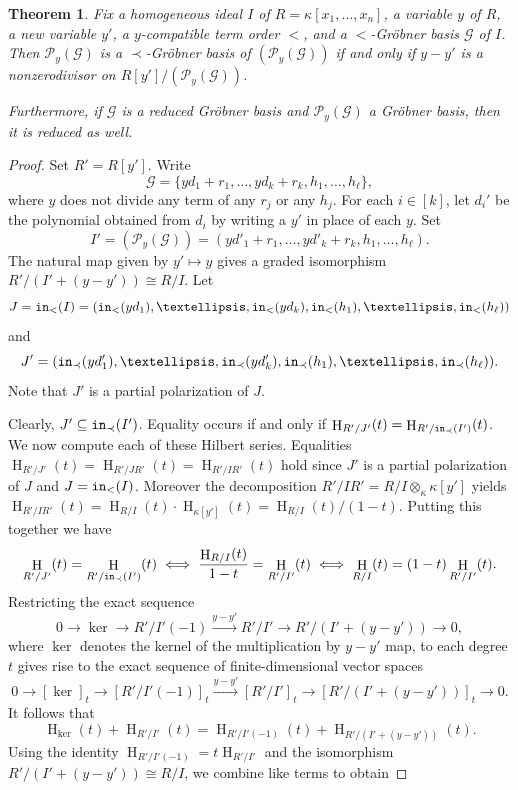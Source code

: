 \documentclass[12pt, reqno]{amsart}
\numberwithin{equation}{section}
\newtheorem{theorem}{Theorem}[section]
\newtheorem{Main Conjecture}[theorem]{Main Conjecture}
\theoremstyle{definition}
\theoremstyle{plain}
\newcommand{\init}{{\tt in}}
\newcommand{\G}{\mathcal{G}}
\renewcommand{\P}{\mathcal{P}}
\DeclareMathOperator{\HS}{H}
\begin{document}
\begin{theorem}\label{thm:inducedGB}
    Fix a homogeneous ideal $I$ of $R = \kappa[x_1, \ldots, x_n]$, a variable $y$ of $R$, a new variable $y'$, a $y$-compatible term order $<$, and a $<$-Gr\"obner basis $\G$ of $I$.  Then $\P_y(\G)$ is a $\prec$-Gr\"obner basis of $(\P_y(\G))$ if and only if $y-y'$ is a nonzerodivisor on $R[y']/(\P_y(\G))$.

    Furthermore, if $\G$ is a reduced Gr\"obner basis and $\P_y(\G)$ a Gr\"obner basis, then it is reduced as well.
\end{theorem} 
\begin{proof}
Set $R' = R[y']$.   Write \[
\G = \{yd_1+r_1, \ldots, yd_k+r_k, h_1, \ldots, h_\ell\},
    \] where $y$ does not divide any term of any $r_j$ or any $h_j$.  For each $i \in [k]$, let $d_i'$ be the polynomial obtained from $d_i$ by writing a $y'$ in place of each $y$.  Set \[
I' = (\P_y(\G)) = (yd'_1+r_1, \ldots, yd'_k+r_k, h_1, \ldots, h_\ell).
    \] The natural map given by $y' \mapsto y$ gives a graded isomorphism $R'/(I'+(y-y')) \cong R/I$.  Let \[
J = \init_<(I) = (\init_<(yd_1), \ldots, \init_<(yd_k), \init_<(h_1), \ldots, \init_<(h_\ell))
\] and \[
J' = (\init_{\prec}(yd'_1), \ldots, \init_{\prec}(yd'_k), \init_{\prec}(h_1), \ldots, \init_{\prec}(h_\ell)).
\] Note that $J'$ is a partial polarization of $J$.  

 Clearly, $J' \subseteq \init_{\prec}(I')$. Equality occurs if and only if $\HS_{R'/J'}(t)=\HS_{R'/\init_{\prec}(I')}(t)$.  We now compute each of these Hilbert series.  Equalities $\HS_{R'/J'}(t)=\HS_{R'/JR'}(t)=\HS_{R'/IR'}(t)$ hold since $J'$ is a partial polarization of $J$ and $J=\init_<(I)$. Moreover the decomposition $R'/IR'=R/I\otimes_\kappa \kappa[y']$ yields $\HS_{R'/IR'}(t)=\HS_{R/I}(t)\cdot \HS_{\kappa[y']}(t)=\HS_{R/I}(t)/(1-t)$. Putting this together we have
\begin{equation}\label{eq:5.1}
    \HS_{R'/J'}(t)= \HS_{R'/\init_{\prec}(I')}(t)  
    \iff \frac{\HS_{R/I}(t)}{1-t}=\HS_{R'/I'}(t)  
    \iff  \HS_{R/I}(t)=(1-t)\HS_{R'/I'}(t).
\end{equation}
Restricting the exact sequence \[
0 \rightarrow \ker \rightarrow R'/I' (-1) \xrightarrow{y-y'} R'/I' \rightarrow R'/(I'+(y-y')) \rightarrow 0,
\] where $\ker$ denotes the kernel of the multiplication by $y-y'$ map, to each degree $t$ gives rise to the exact sequence of finite-dimensional vector spaces 
\[
0 \rightarrow [\ker]_t \rightarrow [R'/I' (-1)]_t \xrightarrow{y-y'} [R'/I']_t \rightarrow [R'/(I'+(y-y'))]_t \rightarrow 0.
\]
It follows that \[
\HS_{\ker}(t)+\HS_{R'/I'}(t)=\HS_{R'/I'(-1)}(t)+\HS_{R'/(I'+(y-y'))}(t).
\]
Using the identity $\HS_{R'/I'(-1)} = t\HS_{R'/I'}$ and the isomorphism $R'/(I'+(y-y')) \cong R/I$, we combine like terms to obtain



\end{proof}
\end{document}
